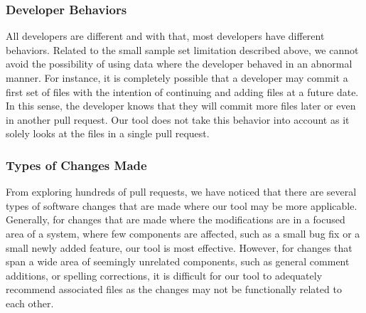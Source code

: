 \subsubsection{Developer Behaviors}

All developers are different and with that, most developers have different behaviors. Related to the small sample set limitation described above, we cannot avoid the possibility of using data where the developer behaved in an abnormal manner. For instance, it is completely possible that a developer may commit a first set of files with the intention of continuing and adding files at a future date. In this sense, the developer knows that they will commit more files later or even in another pull request. Our tool does not take this behavior into account as it solely looks at the files in a single pull request.

\subsubsection{Types of Changes Made}

From exploring hundreds of pull requests, we have noticed that there are several types of software changes that are made where our tool may be more applicable. Generally, for changes that are made where the modifications are in a focused area of a system, where few components are affected, such as a small bug fix or a small newly added feature, our tool is most effective. However, for changes that span a wide area of seemingly unrelated components, such as general comment additions, or spelling corrections, it is difficult for our tool to adequately recommend associated files as the changes may not be functionally related to each other.
